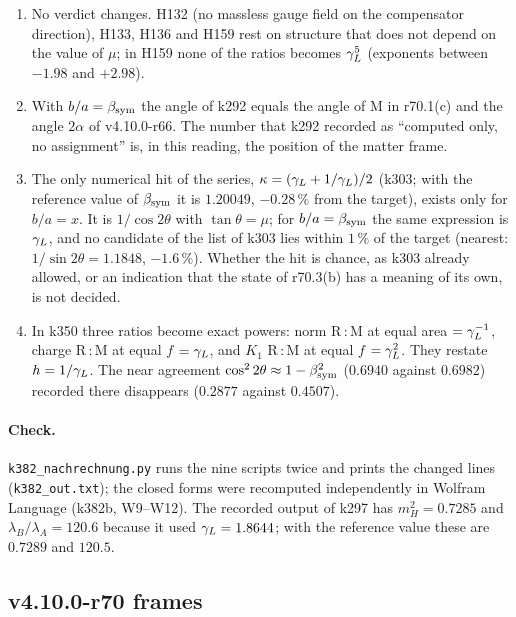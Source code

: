 \begin{enumerate}[leftmargin=2em]
\item[(a)] No verdict changes.  H132 (no massless gauge field on the compensator direction), H133, H136 and H159 rest on structure that does
not depend on the value of \(\mu\); in H159 none of the ratios becomes \(\gamma_L^5\) (exponents between \(-1.98\) and \(+2.98\)).
\item[(b)] With \(b/a=\beta_{\mathrm{sym}}\) the angle of k292 equals the angle of M in r70.1(c) and the angle \(2\alpha\) of v4.10.0-r66.  The number that k292
recorded as ``computed only, no assignment'' is, in this reading, the position of the matter frame.
\item[(c)] The only numerical hit of the series, \(\kappa=(\gamma_L+1/\gamma_L)/2\) (k303; with the reference value of \(\beta_{\mathrm{sym}}\) it is \(1.20049\),
\(-0.28\,\%\) from the target), exists only for \(b/a=x\).  It is \(1/\cos2\theta\) with \(\tan\theta=\mu\); for \(b/a=\beta_{\mathrm{sym}}\) the same expression is
\(\gamma_L\), and no candidate of the list of k303 lies within \(1\,\%\) of the target (nearest: \(1/\sin2\theta=1.1848\), \(-1.6\,\%\)).  Whether the hit
is chance, as k303 already allowed, or an indication that the state of r70.3(b) has a meaning of its own, is not decided.
\item[(d)] In k350 three ratios become exact powers: norm R\,:\,M at equal area \(=\gamma_L^{-1}\), charge R\,:\,M at equal \(f\) \(=\gamma_L\), and
\(K_1\) R\,:\,M at equal \(f\) \(=\gamma_L^{2}\).  They restate \(h=1/\gamma_L\).  The near agreement \(\cos^22\theta\approx1-\beta_{\mathrm{sym}}^2\) (\(0.6940\) against \(0.6982\))
recorded there disappears (\(0.2877\) against \(0.4507\)).
\end{enumerate}

\paragraph{Check.}
\texttt{k382\_nachrechnung.py} runs the nine scripts twice and prints the changed lines (\texttt{k382\_out.txt}); the closed forms were
recomputed independently in Wolfram Language (k382b, W9--W12).  The recorded output of k297 has \(m_H^2=0.7285\) and \(\lambda_B/\lambda_A=120.6\)
because it used \(\gamma_L=1.8644\); with the reference value these are \(0.7289\) and \(120.5\).

\subsection*{v4.10.0-r70 frames}
\label{subsec:v4100-r70-frames}

